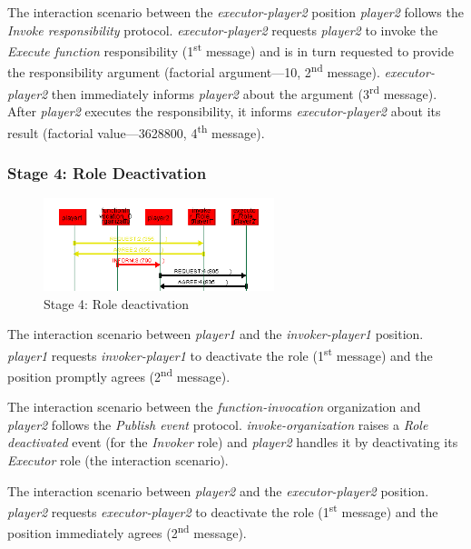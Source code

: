 The {} interaction scenario between the \textit{executor-player2} position \textit{player2} follows the \textit{Invoke responsibility} protocol.
\textit{executor-player2} requests \textit{player2} to invoke the \textit{Execute function} responsibility (1\textsuperscript{st} message) and is in turn requested to provide the responsibility argument (factorial argument---10, 2\textsuperscript{nd} message).
\textit{executor-player2} then immediately informs \textit{player2} about the argument (3\textsuperscript{rd} message).
After \textit{player2} executes the responsibility, it informs \textit{executor-player2} about its result (factorial value---3628800, 4\textsuperscript{th} message).

\subsubsection*{Stage 4: Role Deactivation}

\begin{figure}[H]
	\centering
	\includegraphics[width=0.6\textwidth]{images/examples/example1-stage4}
	\caption{Stage 4: Role deactivation}
	\label{figure:example1-stage4}
\end{figure}

The {} interaction scenario between \textit{player1}  and the \textit{invoker-player1} position.
\textit{player1} requests \textit{invoker-player1} to deactivate the role (1\textsuperscript{st} message) and the position promptly agrees (2\textsuperscript{nd} message).

The {} interaction scenario between the \textit{function-invocation} organization and \textit{player2} follows the \textit{Publish event} protocol.
\textit{invoke-organization} raises a \textit{Role deactivated} event (for the \textit{Invoker} role) and \textit{player2} handles it by deactivating its \textit{Executor} role (the {} interaction scenario).

The {} interaction scenario between \textit{player2} and the \textit{executor-player2} position.
\textit{player2} requests \textit{executor-player2} to deactivate the role (1\textsuperscript{st} message) and the position immediately agrees (2\textsuperscript{nd} message).

